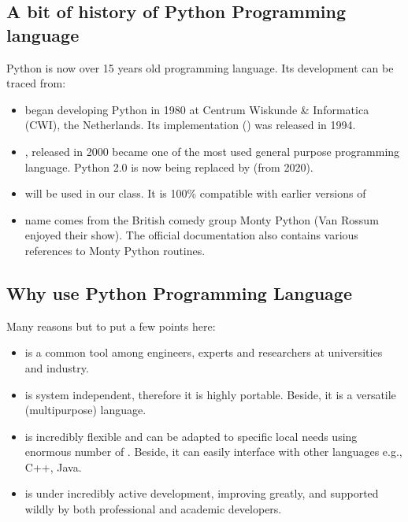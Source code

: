 \documentclass[letterpaper,10pt,english]{sphinxmanual}
\begin{document}
\subsection{A bit of history of Python Programming language}
\label{\detokenize{contents/tutorials/tutorial_01/01_python:a-bit-of-history-of-python-programming-language}}
Python is now over 15 years old programming language. Its development can be traced from:
\begin{itemize}
\item {} 
 began developing Python in 1980 at Centrum Wiskunde \& Informatica (CWI), the Netherlands. Its implementation () was released in 1994.

\item {} 
, released in 2000 became one of the most used general purpose programming language. Python 2.0 is now being replaced by  (from 2020).

\item {} 
 will be used in our class. It is  100\% compatible with earlier versions of 

\item {} 
 name comes from the British comedy group Monty Python (Van Rossum enjoyed their show). The official  documentation  also contains various references to Monty Python routines.

\end{itemize}


\subsection{Why use Python Programming Language}
\label{\detokenize{contents/tutorials/tutorial_01/01_python:why-use-python-programming-language}}
Many reasons but to put a few points here:
\begin{itemize}
\item {} 
 is a common tool among engineers, experts and researchers at universities and industry.

\item {} 
 is system independent, therefore it is highly portable. Beside, it is a versatile (multi\sphinxhyphen{}purpose) language.

\item {} 
 is incredibly flexible and can be adapted to specific local needs using enormous number of . Beside, it can easily interface with other languages e.g., C++, Java.

\item {} 
 is under incredibly active development, improving greatly, and supported wildly by both professional and academic developers.

\end{itemize}
\end{document}
